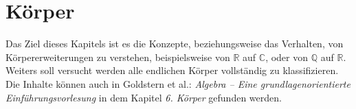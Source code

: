 \chapter{Körper}

Das Ziel dieses Kapitels ist es die Konzepte, beziehungsweise das Verhalten, von Körpererweite\-rungen zu verstehen, beispielsweise von $\mathbb{R}$ auf $\mathbb{C}$, oder von $\mathbb{Q}$ auf $\mathbb{R}$. Weiters soll versucht werden alle endlichen Körper vollständig zu klassifizieren. Die Inhalte können auch in Goldstern et al.: \textit{Algebra -- Eine grundlagenorientierte Einführungsvorlesung} in dem Kapitel \textit{6. Körper} gefunden werden.



